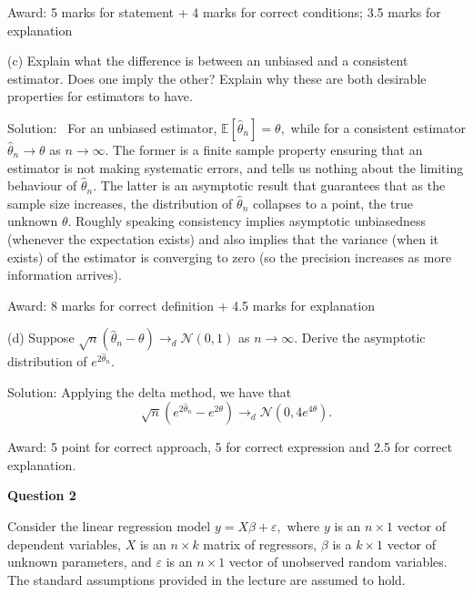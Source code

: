 \documentclass{article}
\begin{document}
Award: 5 marks for statement + 4 marks for correct conditions; 3.5 marks for
explanation

(c) Explain what the difference is between an unbiased and a consistent
estimator. Does one imply the other? Explain why these are both desirable
properties for estimators to have.

Solution: \ For an unbiased estimator, $\mathbb{E}\left[ \hat{\theta}_{n}%
\right] =\theta ,$ while for a consistent estimator $\hat{\theta}%
_{n}\rightarrow \theta $ as $n\rightarrow \infty .$ The former is a finite
sample property ensuring that an estimator is not making systematic errors,
and tells us nothing about the limiting behaviour of $\hat{\theta}_{n}.$ The
latter is an asymptotic result that guarantees that as the sample size
increases, the distribution of $\hat{\theta}_{n}$ collapses to a point, the
true unknown $\theta .$ Roughly speaking consistency implies asymptotic
unbiasedness (whenever the expectation exists) and also implies that the
variance (when it exists) of the estimator is converging to zero (so the
precision increases as more information arrives).

Award: 8 marks for correct definition + 4.5 marks for explanation\bigskip

(d) Suppose $\sqrt{n}\left( \hat{\theta}_{n}-\theta \right) \rightarrow _{d}%
\mathcal{N}\left( 0,1\right) $ as $n\rightarrow \infty .$ Derive the
asymptotic distribution of $e^{2\widehat{\theta }_{n}}.$

\bigskip

Solution: Applying the delta method, we have that 
\begin{equation*}
\sqrt{n}\left( e^{2\hat{\theta}_{n}}-e^{2\theta }\right) \rightarrow _{d}%
\mathcal{N}\left( 0,4e^{4\theta }\right) .
\end{equation*}

Award: 5 point for correct approach, 5 for correct expression and 2.5 for
correct explanation. \bigskip

\textbf{Question 2}

Consider the linear regression model $y=X\beta +\varepsilon ,$ where $y$ is
an $n\times 1$ vector of dependent variables, $X$ is an $n\times k$ matrix
of regressors, $\beta $ is a $k\times 1$ vector of unknown parameters, and $%
\varepsilon $ is an $n\times 1$ vector of unobserved random variables. The
standard assumptions provided in the lecture are assumed to hold.
\end{document}
